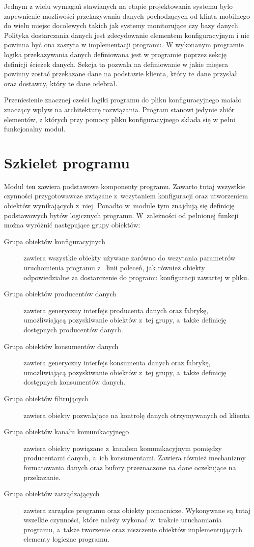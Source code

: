 Jednym z wielu wymagań stawianych na etapie projektowania systemu było
zapewnienie mozliwości przekazywania danych pochodzących od klinta
mobilnego do wielu miejsc docolewych takich jak systemy monitorujące
czy bazy danych. Polityka dostarczania danych jest zdecydowanie
elementem konfiguracyjnym i nie powinna być ona zaszyta w
implementacji programu. W wykonanym programie logika przekazywania
danych definiowana jest w programie poprzez sekcję definicji ścieżek
danych. Sekcja ta pozwala na definiowanie w jakie miejsca powinny
zostać przekazane dane na podstawie klienta, który te dane przysłał
oraz dostawcy, który te dane odebrał.

Przeniesienie znacznej cześci logiki programu do pliku
konfiguracyjnego maiało znaczący wpływ na architekturę
rozwiązania. Program stanowi jedynie zbiór elementów, z których przy
pomocy pliku konfiguracyjnego składa się w pełni funkcjonalny moduł.

\section[Szkielet programu][Szkielet programu]{Szkielet programu}

Moduł ten zawiera podstawowe komponenty programu. Zawarto tutaj
wszystkie czynności przygotowawcze związane z~wczytaniem konfiguracji
oraz utworzeniem obiektów wynikających z~niej. Ponadto w~module tym
znajdują się definicję podstawowych bytów logicznych
programu. W~zależności od pełnionej funkcji można wyróżnić następujące
grupy obiektów:

\begin{description}
\item[Grupa obiektów konfiguracyjnych] zawiera wszystkie obiekty
  używane zarówno do wczytania parametrów uruchomienia programu z~
  linii poleceń, jak również obiekty odpowiedzialne za dostarczenie do
  programu konfiguracji zawartej w pliku.
\item[Grupa obiektów producentów danych] \raggedright{zawiera generyczny interfejs
  producenta danych oraz fabrykę, umożliwiającą pozyskiwanie obiektów
  z~tej grupy, a~także definicję dostępnych producentów danych.}
\item[Grupa obiektów konsumentów danych] zawiera generyczny interfejs
  konsumenta danych oraz fabrykę, umożliwiającą pozyskiwanie obiektów
  z~tej grupy, a~także definicję dostępnych konsumentów danych.
\item[Grupa obiektów filtrujących] zawiera obiekty pozwalające na
  kontrolę danych otrzymywanych od klienta
\item[Grupa obiektów kanału komunikacyjnego] zawiera obiekty powiązane
  z~kanałem komunikacyjnym pomiędzy producentami danych, a~ich
  konsumentami. Zawiera również mechanizmy formatowania danych oraz
  bufory przeznaczone na dane oczekujące na przekazanie.
\item[Grupa obiektów zarządzających] zawiera zarządce programu oraz
  obiekty pomocnicze. Wykonywane są tutaj wszelkie czynności, które
  należy wykonać w~trakcie uruchamiania programu, a~także tworzenie
  oraz niszczenie obiektów implementujących elementy logiczne
  programu.
\end{description}


